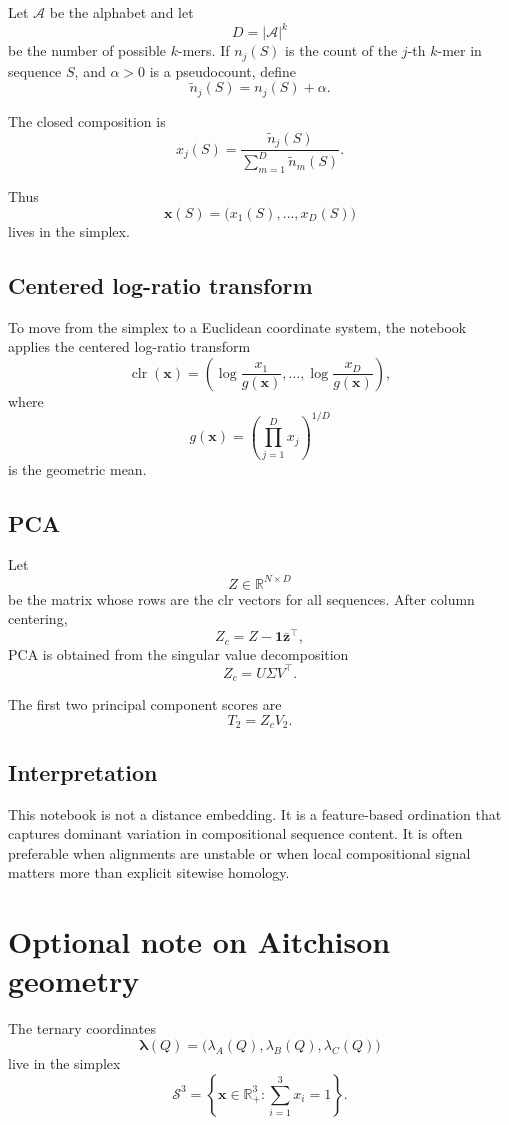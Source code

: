 \documentclass[11pt,a4paper]{article}
\begin{document}
Let $\mathcal{A}$ be the alphabet and let
\[
D=|\mathcal{A}|^k
\]
be the number of possible $k$-mers. If $n_j(S)$ is the count of the $j$-th $k$-mer in sequence $S$, and $\alpha>0$ is a pseudocount, define
\[
\tilde{n}_j(S)=n_j(S)+\alpha.
\]

The closed composition is
\[
x_j(S)=\frac{\tilde{n}_j(S)}{\sum_{m=1}^{D}\tilde{n}_m(S)}.
\]

Thus
\[
\bm{x}(S)=\big(x_1(S),\dots,x_D(S)\big)
\]
lives in the simplex.

\subsection{Centered log-ratio transform}

To move from the simplex to a Euclidean coordinate system, the notebook applies the centered log-ratio transform
\[
\operatorname{clr}(\bm{x})=
\left(
\log\frac{x_1}{g(\bm{x})},
\dots,
\log\frac{x_D}{g(\bm{x})}
\right),
\]
where
\[
g(\bm{x})=\left(\prod_{j=1}^{D}x_j\right)^{1/D}
\]
is the geometric mean.

\subsection{PCA}

Let
\[
Z\in\mathbb{R}^{N\times D}
\]
be the matrix whose rows are the clr vectors for all sequences. After column centering,
\[
Z_c=Z-\bm{1}\bar{\bm{z}}^\top,
\]
PCA is obtained from the singular value decomposition
\[
Z_c=U\Sigma V^\top.
\]

The first two principal component scores are
\[
T_2=Z_cV_2.
\]

\subsection{Interpretation}

This notebook is not a distance embedding. It is a feature-based ordination that captures dominant variation in compositional sequence content. It is often preferable when alignments are unstable or when local compositional signal matters more than explicit sitewise homology.

\section{Optional note on Aitchison geometry}

The ternary coordinates
\[
\bm{\lambda}(Q)=\big(\lambda_A(Q),\lambda_B(Q),\lambda_C(Q)\big)
\]
live in the simplex
\[
\mathcal{S}^3=\left\{\bm{x}\in\mathbb{R}_+^3:\sum_{i=1}^{3}x_i=1\right\}.
\]
\end{document}
